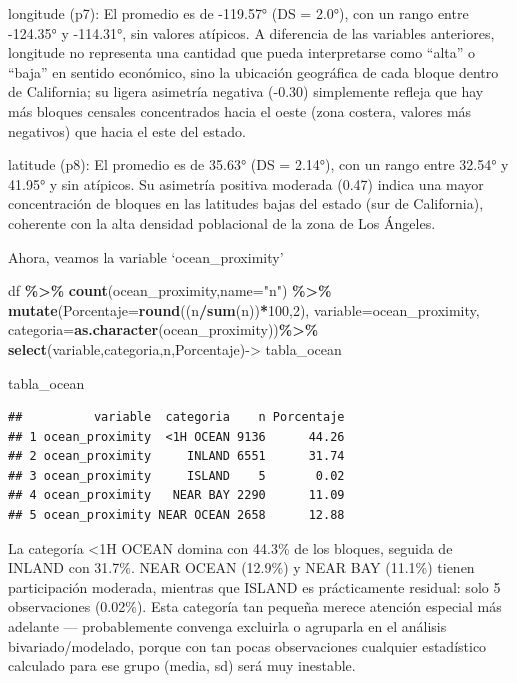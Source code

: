 \documentclass[
]{book}
\newenvironment{Shaded}{\begin{snugshade}}{\end{snugshade}}
\newcommand{\AttributeTok}[1]{\textcolor[rgb]{0.13,0.29,0.53}{#1}}
\newcommand{\DecValTok}[1]{\textcolor[rgb]{0.00,0.00,0.81}{#1}}
\newcommand{\FunctionTok}[1]{\textcolor[rgb]{0.13,0.29,0.53}{\textbf{#1}}}
\newcommand{\NormalTok}[1]{#1}
\newcommand{\OtherTok}[1]{\textcolor[rgb]{0.56,0.35,0.01}{#1}}
\newcommand{\SpecialCharTok}[1]{\textcolor[rgb]{0.81,0.36,0.00}{\textbf{#1}}}
\newcommand{\StringTok}[1]{\textcolor[rgb]{0.31,0.60,0.02}{#1}}
\begin{document}
longitude (p7): El promedio es de -119.57° (DS = 2.0°), con un rango entre -124.35° y -114.31°, sin valores atípicos. A diferencia de las variables anteriores, longitude no representa una cantidad que pueda interpretarse como ``alta'' o ``baja'' en sentido económico, sino la ubicación geográfica de cada bloque dentro de California; su ligera asimetría negativa (-0.30) simplemente refleja que hay más bloques censales concentrados hacia el oeste (zona costera, valores más negativos) que hacia el este del estado.

latitude (p8): El promedio es de 35.63° (DS = 2.14°), con un rango entre 32.54° y 41.95° y sin atípicos. Su asimetría positiva moderada (0.47) indica una mayor concentración de bloques en las latitudes bajas del estado (sur de California), coherente con la alta densidad poblacional de la zona de Los Ángeles.

Ahora, veamos la variable `ocean\_proximity'

\begin{Shaded}
\begin{Highlighting}[]
\NormalTok{df }\SpecialCharTok{\%\textgreater{}\%} 
  \FunctionTok{count}\NormalTok{(ocean\_proximity,}\AttributeTok{name=}\StringTok{"n"}\NormalTok{) }\SpecialCharTok{\%\textgreater{}\%} 
  \FunctionTok{mutate}\NormalTok{(}\AttributeTok{Porcentaje=}\FunctionTok{round}\NormalTok{((n}\SpecialCharTok{/}\FunctionTok{sum}\NormalTok{(n))}\SpecialCharTok{*}\DecValTok{100}\NormalTok{,}\DecValTok{2}\NormalTok{),}
         \AttributeTok{variable=}\StringTok{\textquotesingle{}ocean\_proximity\textquotesingle{}}\NormalTok{,}
         \AttributeTok{categoria=}\FunctionTok{as.character}\NormalTok{(ocean\_proximity))}\SpecialCharTok{\%\textgreater{}\%} \FunctionTok{select}\NormalTok{(variable,categoria,n,Porcentaje)}\OtherTok{{-}\textgreater{}}\NormalTok{ tabla\_ocean}

\NormalTok{tabla\_ocean}
\end{Highlighting}
\end{Shaded}

\begin{verbatim}
##          variable  categoria    n Porcentaje
## 1 ocean_proximity  <1H OCEAN 9136      44.26
## 2 ocean_proximity     INLAND 6551      31.74
## 3 ocean_proximity     ISLAND    5       0.02
## 4 ocean_proximity   NEAR BAY 2290      11.09
## 5 ocean_proximity NEAR OCEAN 2658      12.88
\end{verbatim}

La categoría \textless1H OCEAN domina con 44.3\% de los bloques, seguida de INLAND con 31.7\%. NEAR OCEAN (12.9\%) y NEAR BAY (11.1\%) tienen participación moderada, mientras que ISLAND es prácticamente residual: solo 5 observaciones (0.02\%). Esta categoría tan pequeña merece atención especial más adelante --- probablemente convenga excluirla o agruparla en el análisis bivariado/modelado, porque con tan pocas observaciones cualquier estadístico calculado para ese grupo (media, sd) será muy inestable.
\end{document}
